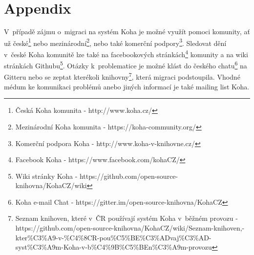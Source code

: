 \documentclass[
	11pt, oneside, printed, final, palatino, monochrome
	microtype,
	table,   %
	lof,     %
	lot     %
]{fithesis3}
\begin{document}
{\chapter*{Appendix}
V~případě zájmu o~migraci na systém Koha je možné využít pomoci komunity, ať už české\footnote{Česká Koha komunita - http://www.koha.cz/} nebo mezinárodní\footnote{Mezinárodní Koha komunita - https://koha-community.org/
}, nebo také komerční podpory\footnote{Komerční podpora Koha - http://www.koha-v-knihovne.cz/}.
Sledovat dění v~české Koha komunitě lze také na facebookových stránkách\footnote{Facebook Koha - https://www.facebook.com/kohaCZ/
} komunity a na wiki stránkách Githubu\footnote{Wiki stránky Koha -  https://github.com/open-source-knihovna/KohaCZ/wiki
}. Otázky k~problematice je možné klást do českého chatu\footnote{Koha e-mail Chat - https://gitter.im/open-source-knihovna/KohaCZ} na Gitteru nebo se zeptat kterékoli knihovny\footnote{Seznam knihoven, které v~ČR používají systém Koha v~běžném provozu - https://github.com/open-source-knihovna/KohaCZ/wiki/Seznam-knihoven,-kter\%C3\%A9-v-\%C4\%8CR-pou\%C5\%BE\%C3\%ADvaj\%C3\%AD-syst\%C3\%A9m-Koha-v-b\%C4\%9B\%C5\%BEn\%C3\%A9m-provozu
}, která migraci podstoupila. Vhodné médum ke komunikaci problémů anebo jiných informací je také mailing list Koha.

}
\end{document}
